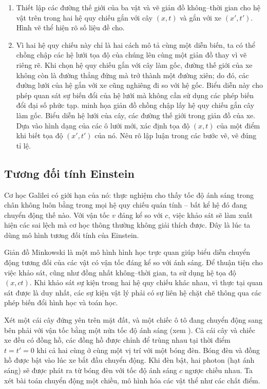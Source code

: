 \begin{enumerate}[label=(\alph*)]
\item Thiết lập các đường thế giới của ba vật và vẽ giản đồ không--thời gian cho hệ vật trên trong hai hệ quy chiếu gắn với cây $\left( x, t \right)$ và gắn với xe $\left( x', t' \right)$. Hình vẽ thể hiện rõ số liệu đề cho. 



\item Vì hai hệ quy chiếu này chỉ là hai cách mô tả cùng một diễn biến, ta có thể chồng chập các hệ lưới tọa độ của chúng lên cùng một giản đồ thay vì vẽ riêng rẽ. Khi chọn hệ quy chiếu gắn với cây làm gốc, đường thế giới của xe không còn là đường thẳng đứng mà trở thành một đường xiên; do đó, các đường lưới của hệ gắn với xe cũng nghiêng đi so với hệ gốc. Biểu diễn này cho phép quan sát sự biến đổi của hệ lưới mà không cần sử dụng các phép biến đổi đại số phức tạp.  minh họa giản đồ chồng chập lấy hệ quy chiếu gắn cây làm gốc. Biểu diễn hệ lưới của cây, các đường thế giới trong giản đồ của xe. Dựa vào hình dạng của các ô lưới mới, xác định tọa độ $\left( x, t \right)$ của một điểm khi biết tọa độ $\left( x', t' \right)$ của nó. Nêu rõ lập luận trong các bước vẽ, vẽ đúng tỉ lệ.
\end{enumerate}

\subsection*{Tương đối tính Einstein}
Cơ học Galilei có giới hạn của nó: thực nghiệm cho thấy tốc độ ánh sáng trong chân không luôn bằng trong mọi hệ quy chiếu quán tính -- bất kể hệ đó đang chuyển động thế nào. Với vận tốc $v$ đáng kể so với $c$, việc khảo sát sẽ làm xuất hiện các sai lệch mà cơ học thông thường không giải thích được. Đây là lúc ta dùng mô hình tương đối tính của Einstein.
\vspace{8pt}

Giản đồ Minkowski là một mô hình hình học trực quan giúp biểu diễn chuyển động tương đối của các vật có vận tốc đáng kể so với ánh sáng. Để thuận tiện cho việc khảo sát, cũng như đồng nhất không--thời gian, ta sử dụng hệ tọa độ $(x, ct)$. Khi khảo sát sự kiện trong hai hệ quy chiếu khác nhau, vì thực tại quan sát được là duy nhất, các sự kiện vật lý phải có sự liên hệ chặt chẽ thông qua các phép biến đổi hình học và toán học.
\vspace{8pt}

Xét một cái cây đứng yên trên mặt đất, và một chiếc ô tô đang chuyển động sang bên phải với vận tốc bằng một nửa tốc độ ánh sáng (xem ). Cả cái cây và chiếc xe đều có đồng hồ, các đồng hồ được chỉnh để trùng nhau tại thời điểm $t=t'=0$ khi cả hai cùng ở cùng một vị trí với một bóng đèn. Bóng đèn và đồng hồ được bật vào lúc xe bắt đầu chuyển động. Khi đèn bật, hai photon (hạt ánh sáng) sẽ được phát ra từ bóng đèn với tốc độ ánh sáng $c$ ngược chiều nhau. Ta xét bài toán chuyển động một chiều, mô hình hóa các vật thể như các chất điểm.

